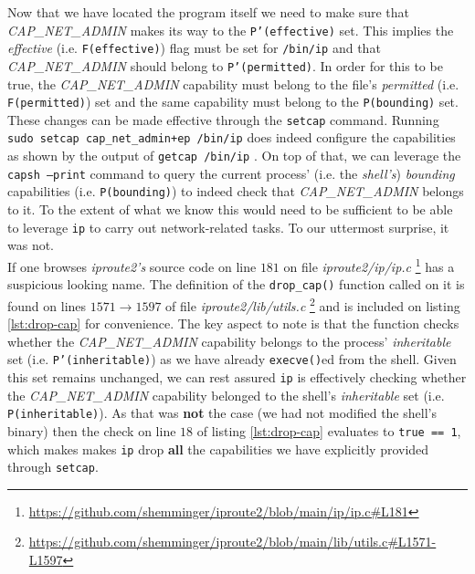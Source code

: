         Now that we have located the program itself we need to make sure that \textit{CAP\_NET\_ADMIN} makes its way to the \texttt{P'(effective)} set. This implies the \textit{effective} (i.e. \texttt{F(effective)}) flag must be set for \texttt{/bin/ip} and that \textit{CAP\_NET\_ADMIN} should belong to \texttt{P'(permitted)}. In order for this to be true, the \textit{CAP\_NET\_ADMIN} capability must belong to the file's \textit{permitted} (i.e. \texttt{F(permitted)}) set and the same capability must belong to the \texttt{P(bounding)} set.\\

        These changes can be made effective through the \texttt{setcap} \cite{bib:man-setcap} command. Running \texttt{sudo setcap cap\_net\_admin+ep /bin/ip} does indeed configure the capabilities as shown by the output of \texttt{getcap /bin/ip} \cite{bib:man-getcap}. On top of that, we can leverage the \texttt{capsh --print} \cite{bib:man-capsh} command to query the current process' (i.e. the \textit{shell's}) \textit{bounding} capabilities (i.e. \texttt{P(bounding)}) to indeed check that \textit{CAP\_NET\_ADMIN} belongs to it. To the extent of what we know this would need to be sufficient to be able to leverage \texttt{ip} to carry out network-related tasks. To our uttermost surprise, it was not.\\

        If one browses \textit{iproute2's} source code on \cite{bib:iproute2-src} line $181$ on file \textit{iproute2/ip/ip.c} \footnote{\url{https://github.com/shemminger/iproute2/blob/main/ip/ip.c\#L181}} has a suspicious looking name. The definition of the \texttt{drop\_cap()} function called on it is found on lines $1571 \to 1597$ of file \textit{iproute2/lib/utils.c} \footnote{\url{https://github.com/shemminger/iproute2/blob/main/lib/utils.c\#L1571-L1597}} and is included on listing \ref{lst:drop-cap} for convenience. The key aspect to note is that the function checks whether the \textit{CAP\_NET\_ADMIN} capability belongs to the process' \textit{inheritable} set (i.e. \texttt{P'(inheritable)}) as we have already \texttt{execve()}ed from the shell. Given this set remains unchanged, we can rest assured \texttt{ip} is effectively checking whether the \textit{CAP\_NET\_ADMIN} capability belonged to the shell's \textit{inheritable} set (i.e. \texttt{P(inheritable)}). As that was \textbf{not} the case (we had not modified the shell's binary) then the check on line $18$ of listing \ref{lst:drop-cap} evaluates to \texttt{true == 1}, which makes makes \texttt{ip} drop \textbf{all} the capabilities we have explicitly provided through \texttt{setcap}.\\

